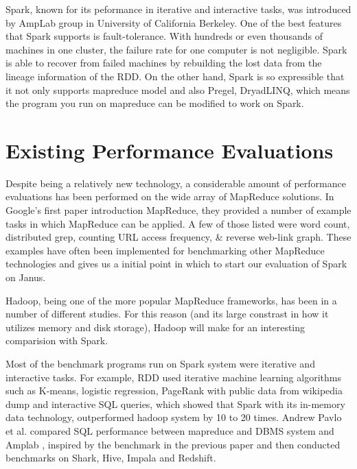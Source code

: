 \documentclass{article}
\begin{document}
Spark\citep{zaharia_rdd}, known for its peformance in iterative and interactive tasks, was introduced by AmpLab group in University of California Berkeley. One of the best features that Spark supports is fault-tolerance. With hundreds or even thousands of machines in one cluster, the failure rate for one computer is not negligible. Spark is able to recover from failed machines by rebuilding the lost data from the lineage information of the RDD. On the other hand, Spark is so expressible that it not only supports mapreduce model and also Pregel, DryadLINQ, which means the program you run on mapreduce can be modified to work on Spark.

\section*{Existing Performance Evaluations }
Despite being a relatively new technology, a considerable amount of performance
evaluations has been performed on the wide array of MapReduce solutions.
In Google's first paper introduction MapReduce, they provided a number of
example tasks in which MapReduce can be applied. A few of those listed were
word count, distributed grep, counting URL access frequency, \& reverse web-link
graph\citep{dean-mapreduce}. These examples have often been implemented for
benchmarking other MapReduce technologies and gives us a initial point in which
to start our evaluation of Spark on Janus.

Hadoop, being one of the more popular MapReduce frameworks, has been in a
number of different studies. For this reason (and its large constrast in how
it utilizes memory and disk storage), Hadoop will make for an interesting
comparision with Spark.

Most of the benchmark programs run on Spark system were iterative and interactive tasks. For example, RDD\citep{zaharia_rdd} used iterative machine learning algorithms such as K-means, logistic regression, PageRank with public data from wikipedia dump and interactive SQL queries, which showed that Spark with its in-memory data technology, outperformed hadoop system by 10 to 20 times. Andrew Pavlo et al. \cite{andrew} compared SQL performance between mapreduce and DBMS system and Amplab \citep{amplab_bench}, inspired by the benchmark in the previous paper and then conducted benchmarks on Shark, Hive\citep{ashish}, Impala and Redshift.
\end{document}
